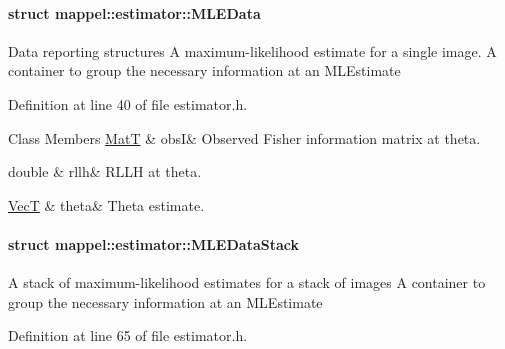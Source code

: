 \paragraph{struct mappel\+:\+:estimator\+:\+:M\+L\+E\+Data}
Data reporting structures A maximum-\/likelihood estimate for a single image. A container to group the necessary information at an M\+L\+Estimate 

Definition at line 40 of file estimator.\+h.

\begin{DoxyFields}{Class Members}
\hyperlink{namespacemappel_a7091ab87c528041f7e2027195fad8915}{MatT}\hypertarget{namespacemappel_1_1estimator_af7233cac905a2e7b6e3aa04ed8e10704}{}\label{namespacemappel_1_1estimator_af7233cac905a2e7b6e3aa04ed8e10704}
&
obsI&
Observed Fisher information matrix at theta. \\
\hline

double\hypertarget{namespacemappel_1_1estimator_a0785477579e8ab6b63ab45b4633b1092}{}\label{namespacemappel_1_1estimator_a0785477579e8ab6b63ab45b4633b1092}
&
rllh&
R\+L\+LH at theta. \\
\hline

\hyperlink{namespacemappel_a2225ad69f358daa3f4f99282a35b9a3a}{VecT}\hypertarget{namespacemappel_1_1estimator_addec61571297c6dbadc300dfcabe9c05}{}\label{namespacemappel_1_1estimator_addec61571297c6dbadc300dfcabe9c05}
&
theta&
Theta estimate. \\
\hline

\end{DoxyFields}
\label{structmappel_1_1estimator_1_1MLEDataStack}
\hypertarget{namespacemappel_1_1estimator_structmappel_1_1estimator_1_1MLEDataStack}{}
\paragraph{struct mappel\+:\+:estimator\+:\+:M\+L\+E\+Data\+Stack}
A stack of maximum-\/likelihood estimates for a stack of images A container to group the necessary information at an M\+L\+Estimate 

Definition at line 65 of file estimator.\+h.

